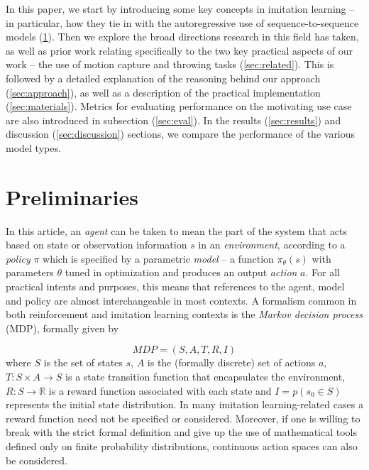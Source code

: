 \documentclass{article}
\begin{document}
In this paper, we start by introducing some key concepts in imitation learning -- in particular, how they tie in with the autoregressive use of sequence-to-sequence models (\ref{sec:prelim}). Then we explore the broad directions research in this field has taken, as well as prior work relating specifically to the two key practical aspects of our work -- the use of motion capture and throwing tasks (\ref{sec:related}). This is followed by a detailed explanation of the reasoning behind our approach (\ref{sec:approach}), as well as a description of the practical implementation (\ref{sec:materials}). Metrics for evaluating performance on the motivating use case are also introduced in subsection (\ref{sec:eval}). In the results (\ref{sec:results}) and discussion (\ref{sec:discussion}) sections, we compare the performance of the various model types. 


\section{Preliminaries}
\label{sec:prelim}

In this article, an \emph{agent} can be taken to mean the part of the system that acts based on state or observation information $s$ in an \emph{environment}, according to a \emph{policy} $\pi$ which is specified by a parametric \emph{model} -- a function $\pi_{\theta}(s)$ with parameters $\theta$ tuned in optimization and produces an output \emph{action} $a$. For all practical intents and purposes, this means that references to the agent, model and policy are almost interchangeable in most contexts. A formalism common in both reinforcement and imitation learning contexts is the \emph{Markov decision process} (MDP), formally given by \citep{attia2018global}

\begin{equation}
	MDP = (S,A,T,R,I)
\end{equation}
where $S$ is the set of states $s$, $A$ is the (formally discrete) set of actions $a$, $T:S \times A \rightarrow S$ is a state transition function that encapsulates the environment, $R:S \rightarrow \mathbb{R}$ is a reward function associated with each state and $I = p\left(s_0 \in S\right)$ represents the initial state distribution. In many imitation learning-related cases a reward function need not be specified or considered. Moreover, if one is willing to break with the strict formal definition and give up the use of mathematical tools defined only on finite probability distributions, continuous action spaces can also be considered.
\end{document}

